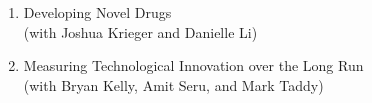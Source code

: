 \documentclass[12pt,letterpaper,serif,overlapped]{res}
\begin{document}
\begin{resume}
\begin{itemize}
\begin{enumerate}
\item Developing Novel Drugs\\(with Joshua Krieger and Danielle Li)
\item Measuring Technological Innovation over the Long Run\\ (with Bryan Kelly, Amit Seru, and Mark Taddy)
\end{enumerate}

%

\vspace{0.5cm}


\end{itemize}
\end{resume}
\end{document}
